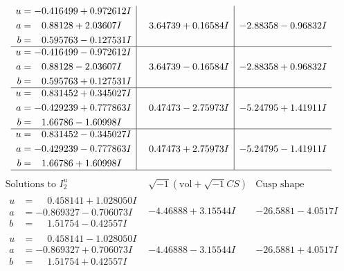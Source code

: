 \documentclass[1p]{elsarticle_modified}
\theoremstyle{definition}
\newcommand{\I}{\sqrt{-1}}
\begin{document}
$$\begin{array}{c|c|c}
\begin{aligned}
u &= -0.416499 + 0.972612 I \\
a &= \phantom{-}0.88128 + 2.03607 I \\
b &= \phantom{-}0.595763 - 0.127531 I\end{aligned}
 & \phantom{-}3.64739 + 0.16584 I & -2.88358 - 0.96832 I \\ \hline\begin{aligned}
u &= -0.416499 - 0.972612 I \\
a &= \phantom{-}0.88128 - 2.03607 I \\
b &= \phantom{-}0.595763 + 0.127531 I\end{aligned}
 & \phantom{-}3.64739 - 0.16584 I & -2.88358 + 0.96832 I \\ \hline\begin{aligned}
u &= \phantom{-}0.831452 + 0.345027 I \\
a &= -0.429239 + 0.777863 I \\
b &= \phantom{-}1.66786 - 1.60998 I\end{aligned}
 & \phantom{-}0.47473 - 2.75973 I & -5.24795 + 1.41911 I \\ \hline\begin{aligned}
u &= \phantom{-}0.831452 - 0.345027 I \\
a &= -0.429239 - 0.777863 I \\
b &= \phantom{-}1.66786 + 1.60998 I\end{aligned}
 & \phantom{-}0.47473 + 2.75973 I & -5.24795 - 1.41911 I\\
 \hline 
 \end{array}$$\newpage$$\begin{array}{c|c|c}  
\text{Solutions to }I^u_{2}& \I (\text{vol} + \sqrt{-1}CS) & \text{Cusp shape}\\
 \hline 
\begin{aligned}
u &= \phantom{-}0.458141 + 1.028050 I \\
a &= -0.869327 - 0.706073 I \\
b &= \phantom{-}1.51754 - 0.42557 I\end{aligned}
 & -4.46888 + 3.15544 I & -26.5881 - 4.0517 I \\ \hline\begin{aligned}
u &= \phantom{-}0.458141 - 1.028050 I \\
a &= -0.869327 + 0.706073 I \\
b &= \phantom{-}1.51754 + 0.42557 I\end{aligned}
 & -4.46888 - 3.15544 I & -26.5881 + 4.0517 I \\ \hline\begin{aligned}

\end{aligned}
\end{array}$$
\end{document}
